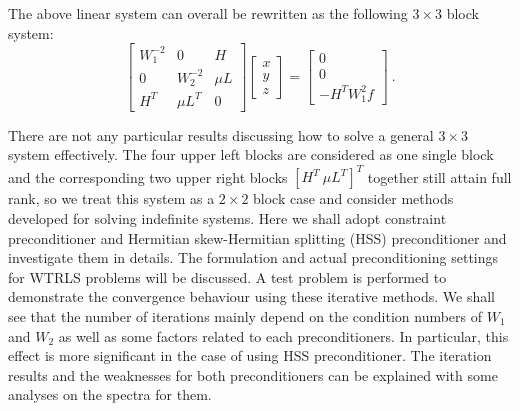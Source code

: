 \documentclass{report}
\begin{document}
The above linear system can overall be rewritten as the following $3 \times 3$ block system:
$$ 
\left[ \begin{array}{ccc} W_{1}^{-2} & 0 & H \\ 0 & W_{2}^{-2} & \mu L \\ H^{T} & \mu L^{T} & 0 \end{array} \right] \left[ \begin{array}{c} x \\ y \\ z \end{array} \right] = \left[ \begin{array}{c} 0 \\ 0 \\ -H^{T} W_{1}^{2} f \end{array} \right]~.
$$


There are not any particular results discussing how
to solve a general $3 \times 3$ system effectively.  
The four upper left blocks are considered as one single
block and the corresponding two upper right blocks
$[H^{T} \ \mu L^{T}]^{T}$ together
still attain full rank, so we treat this system as
a $2 \times 2$ block case 
and consider methods developed for solving indefinite systems.  
Here we shall adopt constraint
preconditioner 
and Hermitian skew-Hermitian splitting (HSS)
preconditioner 
and investigate them in details.
The formulation and actual preconditioning settings
for WTRLS problems will be discussed.
A test problem is performed to demonstrate the convergence behaviour
using these iterative methods.  We shall see that the number of iterations
mainly depend on the condition numbers of $W_{1}$ and $W_{2}$ as
well as some factors related to each preconditioners. 
In particular, this effect is more significant in
the case of using HSS preconditioner.  The iteration results and
the weaknesses for both preconditioners can be explained
with some analyses on the spectra for them.
\end{document}
